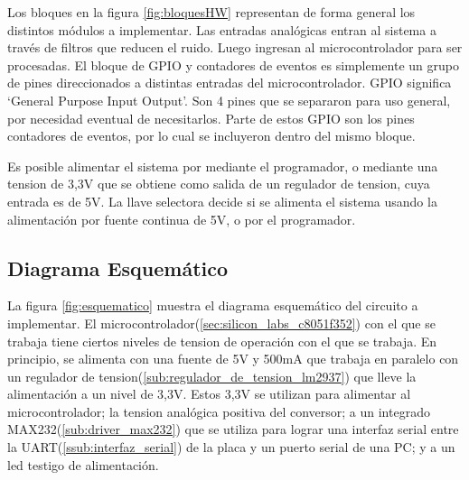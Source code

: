 \documentclass{article}
\theoremstyle{definition}
\theoremstyle{remark}
\begin{document}
Los bloques en la figura \ref{fig:bloquesHW} representan de forma general los distintos módulos a implementar. Las entradas analógicas entran al sistema a través de filtros que reducen el ruido. Luego ingresan al microcontrolador para ser procesadas. El bloque de GPIO y contadores de eventos es simplemente un grupo de pines direccionados a distintas entradas del microcontrolador. GPIO significa `General Purpose Input Output'. Son 4 pines que se separaron para uso general, por necesidad eventual de necesitarlos. Parte de estos GPIO son los pines contadores de eventos, por lo cual se incluyeron dentro del mismo bloque.

Es posible alimentar el sistema por mediante el programador, o mediante una tension de 3,3V que se obtiene como salida de un regulador de tension, cuya entrada es de 5V. La llave selectora decide si se alimenta el sistema usando la alimentación por fuente continua de 5V, o por el programador.




\subsection{Diagrama Esquemático} %
\label{sub:diagrama_esquematico}

La figura \ref{fig:esquematico} muestra el diagrama esquemático del circuito a implementar. El microcontrolador(\ref{sec:silicon_labs_c8051f352}) con el que se trabaja tiene ciertos niveles de tension de operación con el que se trabaja. En principio, se alimenta con una fuente de 5V y 500mA que trabaja en paralelo con un regulador de tension(\ref{sub:regulador_de_tension_lm2937}) que lleve la alimentación a un nivel de 3,3V. Estos 3,3V se utilizan para alimentar al microcontrolador; la tension analógica positiva del conversor; a un integrado MAX232(\ref{sub:driver_max232}) que se utiliza para lograr una interfaz serial entre la UART(\ref{ssub:interfaz_serial}) de la placa y un puerto serial de una PC; y a un led testigo de alimentación.
\end{document}
